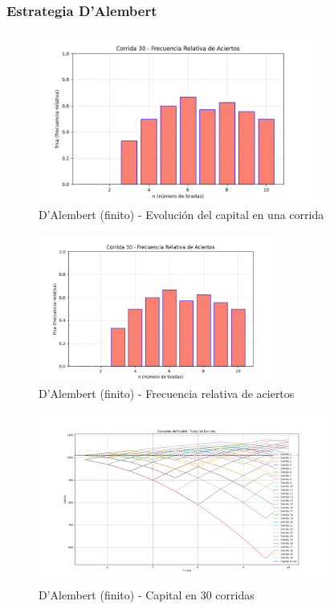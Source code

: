 \documentclass{article}
\begin{document}
\subsubsection*{Estrategia D’Alembert}


\begin{figure}[H]
    \centering
    \includegraphics[width=0.8\textwidth]{./images/frsa_corrida_30_d_f.png}
    \caption{D’Alembert (finito) - Evolución del capital en una corrida}
\end{figure}

\begin{figure}[H]
    \centering
    \includegraphics[width=0.7\textwidth]{./images/frsa_corrida_30_d_f.png}
    \caption{D’Alembert (finito) - Frecuencia relativa de aciertos}
\end{figure}

\begin{figure}[H]
    \centering
    \includegraphics[width=0.85\textwidth]{./images/capital_todas_corridas_d_f.png}
    \caption{D’Alembert (finito) - Capital en 30 corridas}
\end{figure}
\end{document}
